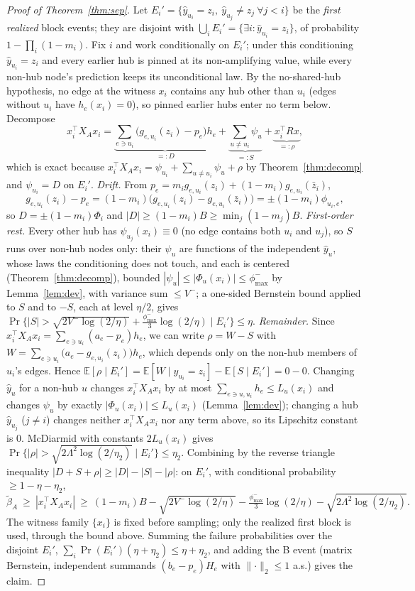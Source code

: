 \documentclass[preprint,11pt]{elsarticle}
\newcommand{\norm}[1]{\lVert #1\rVert}
\begin{document}
\begin{proof}[Proof of Theorem~\ref{thm:sep}]
Let $E_i'=\{\hat y_{u_i}=z_i,\ \hat y_{u_j}\ne z_j\ \forall j<i\}$ be
the \emph{first realized} block events; they are disjoint with
$\bigcup_iE_i'=\{\exists i:\hat y_{u_i}=z_i\}$, of probability
$1-\prod_i(1-m_i)$. Fix $i$ and work conditionally on $E_i'$; under
this conditioning $\hat y_{u_i}=z_i$ and every earlier hub is pinned
at its non-amplifying value, while every non-hub node's prediction
keeps its unconditional law. By the no-shared-hub hypothesis, no edge
at the witness $x_i$ contains any hub other than $u_i$ (edges without
$u_i$ have $h_e(x_i)=0$), so pinned earlier hubs enter no term below.
Decompose
\[
x_i^\top X_Ax_i
=\underbrace{\sum_{e\ni u_i}\bigl(g_{e,u_i}(z_i)-p_e\bigr)h_e}_{=:D}
+\underbrace{\sum_{u\ne u_i}\psi_u}_{=:S}
+\underbrace{x_i^\top Rx}_{=:\rho},
\]
which is exact because $x_i^\top X_Ax_i=\psi_{u_i}+\sum_{u\ne
u_i}\psi_u+\rho$ by Theorem~\ref{thm:decomp} and
$\psi_{u_i}=D$ on $E_i'$.
\emph{Drift.} From $p_e=m_ig_{e,u_i}(z_i)+(1-m_i)g_{e,u_i}(\bar z_i)$,
\[
g_{e,u_i}(z_i)-p_e=(1-m_i)\bigl(g_{e,u_i}(z_i)-g_{e,u_i}(\bar z_i)
\bigr)=\pm(1-m_i)\phi_{u_i,e},
\]
so $D=\pm(1-m_i)\Phi_i$ and $|D|\ge(1-m_i)B\ge\min_j(1-m_j)B$.
\emph{First-order rest.} Every other hub has
$\psi_{u_j}(x_i)\equiv0$ (no edge contains both $u_i$ and $u_j$), so
$S$ runs over non-hub nodes only: their $\psi_u$ are functions of the
independent $\hat y_u$, whose laws the conditioning does not touch,
and each is centered (Theorem~\ref{thm:decomp}), bounded
$|\psi_u|\le|\Phi_u(x_i)|\le\phi^-_{\max}$ by
Lemma~\ref{lem:dev}, with variance sum $\le V^-$; a one-sided
Bernstein bound applied to $S$ and to $-S$, each at level $\eta/2$,
gives
$\Pr\{|S|>\sqrt{2V^-\log(2/\eta)}+\tfrac{\phi^-_{\max}}3
\log(2/\eta)\mid E_i'\}\le\eta$.
\emph{Remainder.} Since
$x_i^\top X_Ax_i=\sum_{e\ni u_i}(a_e-p_e)h_e$, we can write
$\rho=W-S$ with
$W=\sum_{e\ni u_i}\bigl(a_e-g_{e,u_i}(z_i)\bigr)h_e$, which depends
only on the non-hub members of $u_i$'s edges. Hence
$\mathbb E[\rho\mid E_i']
=\mathbb E[W\mid\hat y_{u_i}=z_i]-\mathbb E[S\mid E_i']=0-0$.
Changing $\hat y_u$ for a non-hub $u$ changes
$x_i^\top X_Ax_i$ by at most $\sum_{e\ni u,u_i}h_e\le L_u(x_i)$ and
changes $\psi_u$ by exactly $|\Phi_u(x_i)|\le L_u(x_i)$
(Lemma~\ref{lem:dev}); changing a hub $\hat y_{u_j}$ ($j\ne i$)
changes neither $x_i^\top X_Ax_i$ nor any term above, so its
Lipschitz constant is $0$. McDiarmid with constants $2L_u(x_i)$ gives
$\Pr\{|\rho|>\sqrt{2\Lambda^2\log(2/\eta_2)}\mid E_i'\}\le\eta_2$.
Combining by the reverse triangle inequality
$|D+S+\rho|\ge|D|-|S|-|\rho|$: on $E_i'$, with conditional
probability $\ge1-\eta-\eta_2$,
\[
\widetilde\beta_A\ \ge\ |x_i^\top X_Ax_i|\ \ge\ (1-m_i)B
-\sqrt{2V^-\log(2/\eta)}-\tfrac{\phi^-_{\max}}3\log(2/\eta)
-\sqrt{2\Lambda^2\log(2/\eta_2)} .
\]
The witness family $\{x_i\}$ is fixed before sampling; only the
realized first block is used, through the bound above. Summing the
failure probabilities over the disjoint $E_i'$,
$\sum_i\Pr(E_i')(\eta+\eta_2)\le\eta+\eta_2$, and adding the B event
(matrix Bernstein, independent summands
$(b_e-p_e)H_e$ with $\norm{\cdot}_2\le1$ a.s.) gives the claim.
\end{proof}
\end{document}
